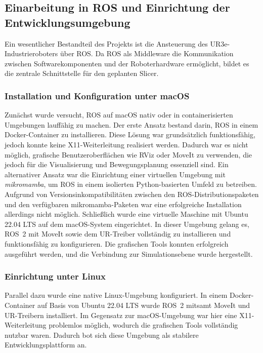 \documentclass[
	paper=a4,
	fontsize=11pt,
	parskip=half,
	headings=normal,
	bibliography=totoc,
	listof=totoc
]{scrartcl}
\begin{document}
\subsection{Einarbeitung in ROS und Einrichtung der Entwicklungsumgebung}
	Ein wesentlicher Bestandteil des Projekts ist die Ansteuerung des UR3e-Industrieroboters über ROS.
	Da ROS als Middleware die Kommunikation zwischen Softwarekomponenten und der Roboterhardware ermöglicht, bildet es die zentrale Schnittstelle für den geplanten Slicer.

\subsubsection{Installation und Konfiguration unter macOS}
	Zunächst wurde versucht, ROS auf macOS nativ oder in containerisierten Umgebungen lauffähig zu machen.
	Der erste Ansatz bestand darin, ROS in einem Docker-Container zu installieren.
	Diese Lösung war grundsätzlich funktionsfähig, jedoch konnte keine X11-Weiterleitung realisiert werden.
	Dadurch war es nicht möglich, grafische Benutzeroberflächen wie RViz oder MoveIt zu verwenden, die jedoch für die Visualisierung und Bewegungsplanung essenziell sind.
	Ein alternativer Ansatz war die Einrichtung einer virtuellen Umgebung mit \emph{mikromamba}, um ROS in einem isolierten Python-basierten Umfeld zu betreiben.
	Aufgrund von Versionsinkompatibilitäten zwischen den ROS-Distributionspaketen und den verfügbaren mikromamba-Paketen war eine erfolgreiche Installation allerdings nicht möglich.
	Schließlich wurde eine virtuelle Maschine mit Ubuntu 22.04 LTS auf dem macOS-System eingerichtet.
	In dieser Umgebung gelang es, ROS~2 mit MoveIt sowie dem UR-Treiber vollständig zu installieren und funktionsfähig zu konfigurieren.
	Die grafischen Tools konnten erfolgreich ausgeführt werden, und die Verbindung zur Simulationsebene wurde hergestellt.

\subsubsection{Einrichtung unter Linux}
	Parallel dazu wurde eine native Linux-Umgebung konfiguriert.
	In einem Docker-Container auf Basis von Ubuntu 22.04 LTS wurde ROS~2 mitsamt MoveIt und UR-Treibern installiert.
	Im Gegensatz zur macOS-Umgebung war hier eine X11-Weiterleitung problemlos möglich, wodurch die grafischen Tools vollständig nutzbar waren.
	Dadurch bot sich diese Umgebung als stabilere Entwicklungsplattform an.
\end{document}
